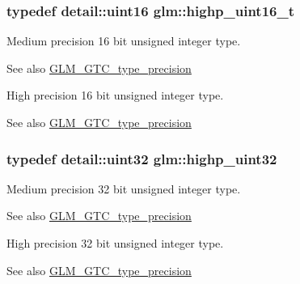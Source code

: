 \subsubsection[{highp\+\_\+uint16\+\_\+t}]{\setlength{\rightskip}{0pt plus 5cm}typedef {\bf detail\+::uint16} {\bf glm\+::highp\+\_\+uint16\+\_\+t}}\label{group__gtc__type__precision_ga3145bc0ee80432c165e985a188a722b3}
Medium precision 16 bit unsigned integer type. \begin{DoxySeeAlso}{See also}
\hyperlink{group__gtc__type__precision}{G\+L\+M\+\_\+\+G\+T\+C\+\_\+type\+\_\+precision}
\end{DoxySeeAlso}
High precision 16 bit unsigned integer type. \begin{DoxySeeAlso}{See also}
\hyperlink{group__gtc__type__precision}{G\+L\+M\+\_\+\+G\+T\+C\+\_\+type\+\_\+precision} 
\end{DoxySeeAlso}
\hypertarget{group__gtc__type__precision_ga3145e44c73e2df7dfe4f3cb65974bf22}{}
\subsubsection[{highp\+\_\+uint32}]{\setlength{\rightskip}{0pt plus 5cm}typedef {\bf detail\+::uint32} {\bf glm\+::highp\+\_\+uint32}}\label{group__gtc__type__precision_ga3145e44c73e2df7dfe4f3cb65974bf22}
Medium precision 32 bit unsigned integer type. \begin{DoxySeeAlso}{See also}
\hyperlink{group__gtc__type__precision}{G\+L\+M\+\_\+\+G\+T\+C\+\_\+type\+\_\+precision}
\end{DoxySeeAlso}
High precision 32 bit unsigned integer type. \begin{DoxySeeAlso}{See also}
\hyperlink{group__gtc__type__precision}{G\+L\+M\+\_\+\+G\+T\+C\+\_\+type\+\_\+precision} 
\end{DoxySeeAlso}
\hypertarget{group__gtc__type__precision_ga8eb85ad460079c63b68866ae34637bda}{}
